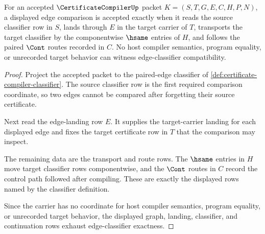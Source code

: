 \begin{theorem}
\label{thm:certificate-compiler-edge-classifier-exactness}
For an accepted $\CertificateCompilerUp$ packet $K=(S,T,G,E,C,H,P,N)$, a displayed edge comparison is accepted exactly when it reads the source classifier row in $S$, lands through $E$ in the target carrier of $T$, transports the target classifier by the componentwise $\hsame$ entries of $H$, and follows the paired $\Cont$ routes recorded in $C$. No host compiler semantics, program equality, or unrecorded target behavior can witness edge-classifier compatibility.
\end{theorem}
\begin{proof}
Project the accepted packet to the paired-edge classifier of \autoref{def:certificate-compiler-classifier}. The source classifier row is the first required comparison coordinate, so two edges cannot be compared after forgetting their source certificate.

Next read the edge-landing row $E$. It supplies the target-carrier landing for each displayed edge and fixes the target certificate row in $T$ that the comparison may inspect.

The remaining data are the transport and route rows. The $\hsame$ entries in $H$ move target classifier rows componentwise, and the $\Cont$ routes in $C$ record the control path followed after compiling. These are exactly the displayed rows named by the classifier definition.

Since the carrier has no coordinate for host compiler semantics, program equality, or unrecorded target behavior, the displayed graph, landing, classifier, and continuation rows exhaust edge-classifier exactness.
\end{proof}

